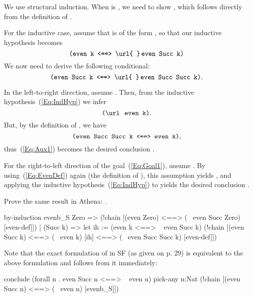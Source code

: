 \begin{solution}[print=true]
We use structural induction. When  is , we need to show , which follows
directly from the definition of . 

For the inductive case, assume that  is of the form , so that our inductive hypothesis becomes
\begin{equation}
\mtt{(even k <==> \url{~}$\ls$even Succ k)}
\label{Eq:IndHyp}
\end{equation}
We now need to derive the following conditional:
\begin{equation}
\mtt{(even Succ k <==> \url{~}$\ls$even Succ Succ k)}. 
\label{Eq:Goal1}
\end{equation}

In the left-to-right direction, assume . Then, from the inductive hypothesis~(\ref{Eq:IndHyp})
we infer 
\begin{equation}
\mtt{(\tneg even k)}.
\label{Eq:Aux1}
\end{equation}
But, by the definition of , we have 
\begin{equation}
\mtt{(even Succ Succ k <==> even k)},
\label{Eq:EvenDef}
\end{equation}
thus~(\ref{Eq:Aux1}) becomes the desired conclusion .

For the right-to-left direction of the goal~(\ref{Eq:Goal1}), assume . 
By using~(\ref{Eq:EvenDef}) again (the definition of ), this assumption yields 
, and applying the inductive hypothesis~(\ref{Eq:IndHyp}) to 
 yields the desired conclusion . 
\end{solution}
\begin{exercise}[subtitle={\mbox{\rm{\em (SF Exercise 1.0.3, p. 29)}}}]
Prove the same result in Athena: . 
\end{exercise}
\begin{solution}[print=true]
\begin{tcAthena}
  by-induction evenb_S {
    Zero => (!chain [(even Zero) 
                <==> (~ even Succ Zero)                   [even-def]])
  | (Succ k) => let {ih := (even k <==> ~ even Succ k)}
                  (!chain [(even Succ k)
                      <==> (~ even k)                     [ih]
                      <==> (~ even Succ Succ k)           [even-def]])
  }
\end{tcAthena}
Note that the exact formulation of  in SF (as given on p. 29) is equivalent to the above formulation
and follows from it immediately: 
\begin{tcAthena}
conclude (forall n . even Succ n <==> ~ even n) 
  pick-any n:Nat
    (!chain [(even Succ n) <==> (~ even n) [evenb_S]])
\end{tcAthena}
\end{solution}
